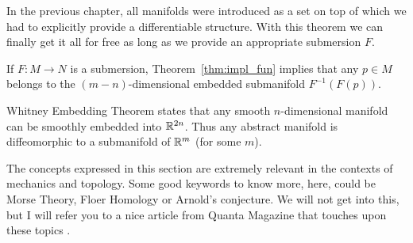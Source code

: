 In the previous chapter, all manifolds were introduced as a set on top of which we had to explicitly provide a differentiable structure. With this theorem we can finally get it all for free as long as we provide an appropriate submersion $F$.

\begin{remark}
	If $F:M\to N$ is a submersion, Theorem~\ref{thm:impl_fun} implies that any $p\in M$ belongs to the $(m-n)$-dimensional embedded submanifold $F^{-1}(F(p))$.
\end{remark}

%

\begin{remark}\label{rmk:WhitneyET}
	Whitney Embedding Theorem states that any smooth $n$-dimensional manifold can be smoothly embedded into $\mathbb{R}^{2n}$.
	Thus any abstract manifold is diffeomorphic to a submanifold of $\mathbb{R}^m$ (for some $m$).
\end{remark}

\begin{remark}
	The concepts expressed in this section are extremely relevant in the contexts of mechanics and topology.
	Some good keywords to know more, here, could be Morse Theory, Floer Homology or Arnold's conjecture.
	We will not get into this, but I will refer you to a nice article from Quanta Magazine that touches upon these topics \cite{article:quanta:floer}.
\end{remark}

